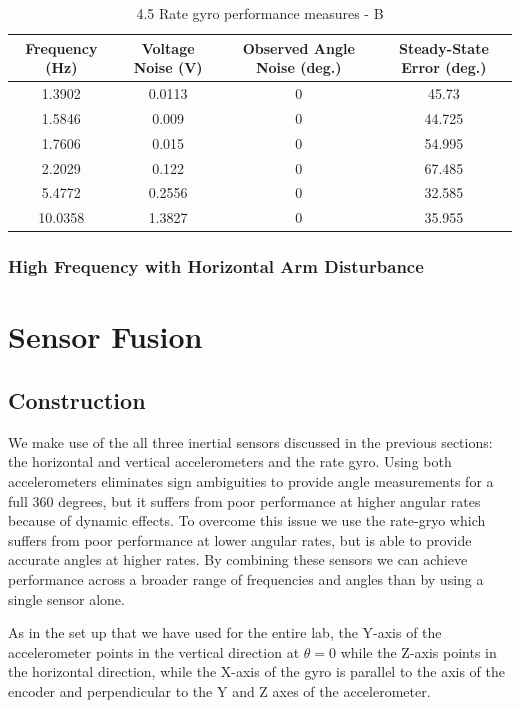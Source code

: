 \documentclass{article}
\theoremstyle{plain}
\theoremstyle{definition}
\theoremstyle{remark}
\begin{document}
\begin{table}
\begin{center}
    \begin{tabular}{|c|c|c|c|}
        \hline
        Frequency (Hz)  & Voltage Noise (V) & Observed Angle Noise (deg.) & Steady-State Error (deg.) \\ \hline
	1.3902  & 0.0113  & 0 & 45.73\\
       1.5846  & 0.009  & 0 & 44.725 \\
	1.7606  & 0.015 & 0 & 54.995  \\
	2.2029 & 0.122  & 0 & 67.485   \\
	5.4772 & 0.2556  & 0 & 32.585  \\
	10.0358 & 1.3827 & 0 & 35.955 \\
        \hline
    \end{tabular}
\caption{4.5 Rate gyro performance measures - B}  
\label{gyro45_tableB}
\end{center}
\end{table}

\subsubsection{High Frequency with Horizontal Arm Disturbance}
\clearpage
\section{Sensor Fusion}

\subsection{Construction}
We make use of the all three inertial sensors discussed in the previous sections: the horizontal and vertical accelerometers and the rate gyro.  Using both accelerometers eliminates sign ambiguities to provide angle measurements for a full 360 degrees, but it suffers from poor performance at higher angular rates because of dynamic effects.  To overcome this issue we use the rate-gryo which suffers from poor performance at lower angular rates, but is able to provide accurate angles at higher rates.  By combining these sensors we can achieve performance across a broader range of frequencies and angles than by using a single sensor alone.  

As in the set up that we have used for the entire lab, the Y-axis of the accelerometer points in the vertical direction at $\theta = 0$ while the Z-axis points in the horizontal direction, while the X-axis of the gyro is parallel to the axis of the encoder and perpendicular to the Y and Z axes of the accelerometer.  
\end{document}
